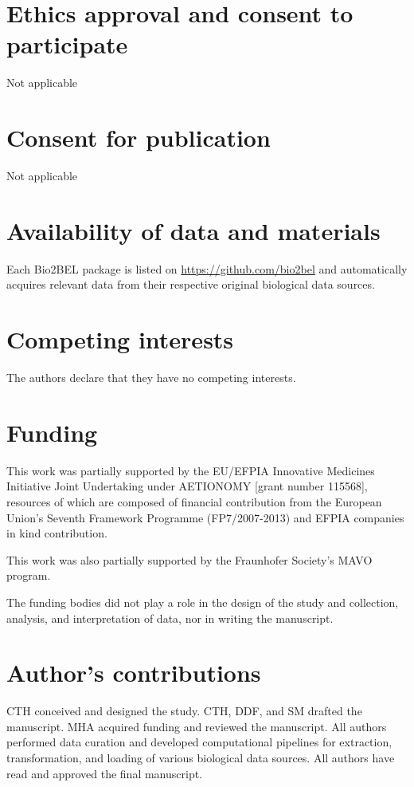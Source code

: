 \documentclass{bmcart}
\begin{document}
\begin{backmatter}

\section*{Ethics approval and consent to participate}
Not applicable

\section*{Consent for publication}
Not applicable

\section*{Availability of data and materials}
Each Bio2BEL package is listed on \url{https://github.com/bio2bel} and automatically acquires relevant data from their respective original biological data sources.

\section*{Competing interests}
The authors declare that they have no competing interests.

\section*{Funding}
This work was partially supported by the EU/EFPIA Innovative Medicines Initiative Joint Undertaking under AETIONOMY [grant number 115568], resources of which are composed of financial contribution from the European Union's Seventh Framework Programme (FP7/2007-2013) and EFPIA companies in kind contribution.

This work was also partially supported by the Fraunhofer Society's MAVO program.

The funding bodies did not play a role in the design of the study and collection, analysis, and interpretation of data, nor in writing the manuscript.

\section*{Author's contributions}
CTH conceived and designed the study.
CTH, DDF, and SM drafted the manuscript.
MHA acquired funding and reviewed the manuscript.
All authors performed data curation and developed computational pipelines for extraction, transformation, and loading of various biological data sources.
All authors have read and approved the final manuscript.


\end{backmatter}
\end{document}

